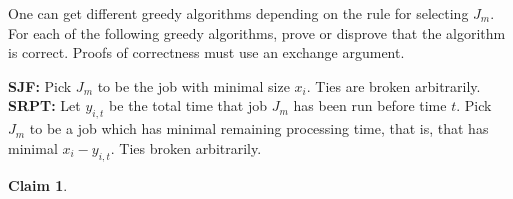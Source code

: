 \documentclass{article}
\newtheorem{thm}{Claim}
\begin{document}
    One can get different greedy algorithms depending on the rule for selecting $J_m$. 
    For each of the following greedy algorithms, prove or disprove that the algorithm is correct. 
    Proofs of correctness must use an exchange argument.
    
    \textbf{SJF:} Pick $J_m$ to be the job with minimal size $x_i$.
    Ties are broken arbitrarily.
    \textbf{SRPT:} Let $y_{i,t}$ be the total time that job $J_m$ has been run before time $t$.
    Pick $J_m$ to be a job which has minimal remaining processing time, that is, that has minimal $x_i - y_{i, t}$.
    Ties broken arbitrarily.
    
    
    \begin{thm}
        
    \end{thm}
\end{document}
